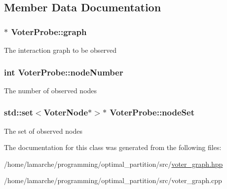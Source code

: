 \subsection{Member Data Documentation}
\hypertarget{classVoterProbe_add099ac2ac20a5f6a0e3616e78639497}{
\subsubsection[{graph}]{$\ast$ Voter\-Probe\-::graph}}\label{classVoterProbe_add099ac2ac20a5f6a0e3616e78639497}
The interaction graph to be observed \hypertarget{classVoterProbe_af0a20a6fc8a68f3ace3384cbbd6aa39f}{
\subsubsection[{node\-Number}]{\setlength{\rightskip}{0pt plus 5cm}int Voter\-Probe\-::node\-Number}}\label{classVoterProbe_af0a20a6fc8a68f3ace3384cbbd6aa39f}
The number of observed nodes \hypertarget{classVoterProbe_ae51e09098a03f3e064c8a1a8182a2eeb}{
\subsubsection[{node\-Set}]{\setlength{\rightskip}{0pt plus 5cm}std\-::set$<${\bf Voter\-Node}$\ast$$>$$\ast$ Voter\-Probe\-::node\-Set}}\label{classVoterProbe_ae51e09098a03f3e064c8a1a8182a2eeb}
The set of observed nodes 

The documentation for this class was generated from the following files\-:\begin{DoxyCompactItemize}
\item 
/home/lamarche/programming/optimal\-\_\-partition/src/\hyperlink{voter__graph_8hpp}{voter\-\_\-graph.\-hpp}\item 
/home/lamarche/programming/optimal\-\_\-partition/src/voter\-\_\-graph.\-cpp\end{DoxyCompactItemize}
